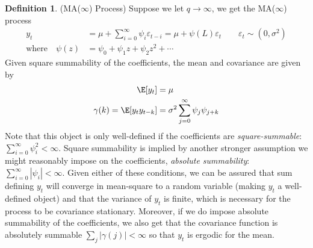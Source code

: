 \documentclass[12pt]{article}
\theoremstyle{plain}
\theoremstyle{definition}
\newtheorem{defn}[thm]{Definition}
\theoremstyle{remark}
\newcommand{\ra}{\rightarrow}
\begin{document}
\begin{defn}(MA($\infty$) Process)
Suppose we let $q\ra\infty$, we get the MA($\infty$) process
\begin{align*}
  y_t &= \mu + \sum_{i=0}^\infty \psi_i \varepsilon_{t-i}
  = \mu + \psi(L)\varepsilon_t
  \qquad \varepsilon_t\sim (0,\sigma^2)
  \\
  \text{where}\quad
  \psi(z) &= \psi_0 + \psi_1z + \psi_2z^2 + \cdots
\end{align*}
Given square summability of the coefficients, the mean and covariance
are given by
\begin{align*}
  \E[y_t] &= \mu\\
  \gamma(k) = \E[y_ty_{t-k}] &=
  \sigma^2
  \sum_{j=0}^{\infty}
  \psi_j \psi_{j+k}
\end{align*}
Note that this object is only well-defined if the coefficients are
\emph{square-summable}: $\sum_{i=0}^\infty \psi_i^2<\infty$. Square
summability is implied by another stronger assumption we might
reasonably impose on the coefficients, \emph{absolute summability}:
$\sum_{i=0}^\infty |\psi_i|<\infty$.
Given either of these conditions, we can be assured that sum defining
$y_t$ will converge in mean-square to a random variable (making
$y_t$ a well-defined object) and that the variance of $y_t$ is finite,
which is necessary for the process to be covariance stationary.
Moreover, if we do impose absolute summability of the coefficients, we
also get that the covariance function is absolutely summable
$\sum_j |\gamma(j)|<\infty$ so that $y_t$ is ergodic for the mean.
\end{defn}
\end{document}

